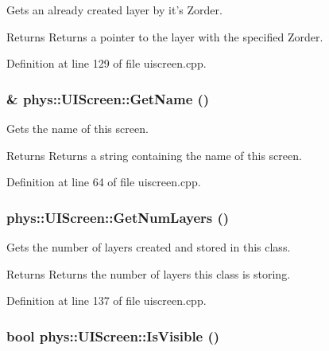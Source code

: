 Gets an already created layer by it's Zorder. 

\begin{DoxyReturn}{Returns}
Returns a pointer to the layer with the specified Zorder. 
\end{DoxyReturn}


Definition at line 129 of file uiscreen.cpp.

\hypertarget{classphys_1_1UIScreen_aee363edcdc7d21197e4103668011f8fb}{
\subsubsection[{GetName}]{ \& phys::UIScreen::GetName ()}}
\label{d9/de8/classphys_1_1UIScreen_aee363edcdc7d21197e4103668011f8fb}


Gets the name of this screen. 

\begin{DoxyReturn}{Returns}
Returns a string containing the name of this screen. 
\end{DoxyReturn}


Definition at line 64 of file uiscreen.cpp.

\hypertarget{classphys_1_1UIScreen_a87c4cf832f36af0182483814fec30f88}{
\subsubsection[{GetNumLayers}]{ phys::UIScreen::GetNumLayers ()}}
\label{d9/de8/classphys_1_1UIScreen_a87c4cf832f36af0182483814fec30f88}


Gets the number of layers created and stored in this class. 

\begin{DoxyReturn}{Returns}
Returns the number of layers this class is storing. 
\end{DoxyReturn}


Definition at line 137 of file uiscreen.cpp.

\hypertarget{classphys_1_1UIScreen_a8f64052f7bb0b6be2f55c73f31bfea29}{
\subsubsection[{IsVisible}]{\setlength{\rightskip}{0pt plus 5cm}bool phys::UIScreen::IsVisible ()}}
\label{d9/de8/classphys_1_1UIScreen_a8f64052f7bb0b6be2f55c73f31bfea29}


